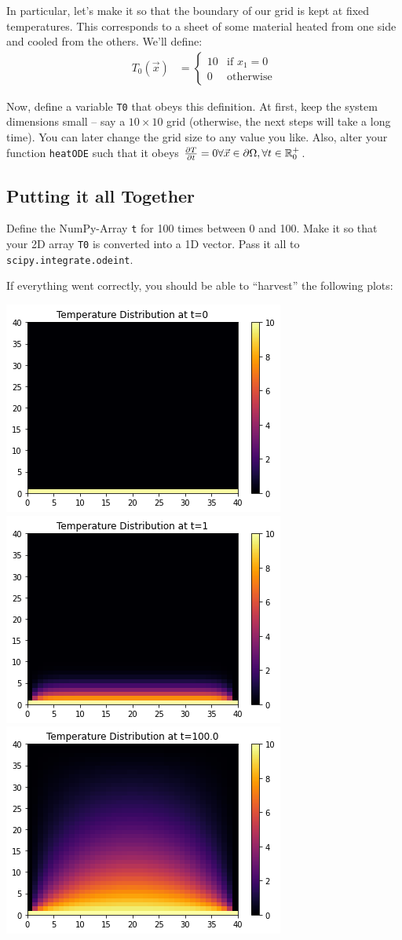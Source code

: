 \documentclass[
	english,
	fontsize=10pt,
	parskip=half,
	titlepage=true,
	DIV=12
]{scrartcl}
\begin{document}
In particular, let's make it so that the boundary of our grid is kept at fixed temperatures. This corresponds to a sheet of some material heated from one side and cooled from the others. We'll define:
\begin{align*}
	T_0(\vec{x})
&=
	\begin{cases}
		10 & \text{if } x_1 = 0 \\
		 0 & \text{otherwise}
	\end{cases}
\end{align*}

Now, define a variable \texttt{T0} that obeys this definition. At first, keep the system dimensions small -- say a $10 \times 10$ grid (otherwise, the next steps will take a long time). You can later change the grid size to any value you like. Also, alter your function \texttt{heatODE} such that it obeys 
$\pdv{T}{t}(\vec{x}) = 0 \forall \vec{x} \in \partial \Omega, \forall t \in \mathbb{R}_{0}^{+}$.

\subsection{Putting it all Together}
Define the NumPy-Array \texttt{t} for 100 times between 0 and 100. Make it so that your 2D array \texttt{T0} is converted into a 1D vector. Pass it all to \texttt{scipy.integrate.odeint}. 

If everything went correctly, you should be able to \enquote{harvest} the following plots:
\begin{center}
	\includegraphics[width=.3\linewidth]{./TDist-0}
	\includegraphics[width=.3\linewidth]{./TDist-1}
	\includegraphics[width=.3\linewidth]{./TDist-100}
\end{center}
\end{document}

